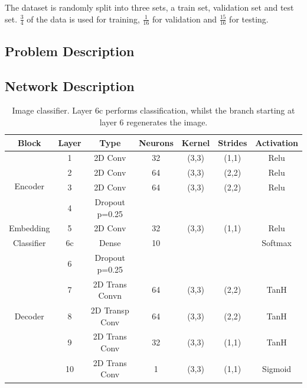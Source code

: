 The dataset is randomly split into three sets, a train set, validation set and test set. $\frac{3}{4}$ of the data is used for training, $\frac{1}{16}$ for validation and $\frac{15}{16}$ for testing.	


\subsection{Problem Description}
\subsection{Network Description}
\begin{table}[t]
		\centering
		\begin{tabular}{|c|c|c|c|c|c|c|}
			\hline
			Block & Layer & Type & Neurons & Kernel & Strides & Activation  \\ \hline
			\multirow{4}{*}{Encoder} & 1	&	2D Conv & 32 & (3,3) & (1,1)  & Relu\\ \cline{2-7}
			& 2	&	2D Conv & 64 & (3,3) & (2,2) & Relu \\ \cline{2-7}
			& 3	&	2D Conv & 64 & (3,3) & (2,2) & Relu \\ \cline{2-7}
			& 4 	&	Dropout p=0.25 &	 & 	     &       & \\ \hline
			Embedding & 5	&	2D Conv & 32 & (3,3) & (1,1) & Relu \\ \hline
			Classifier & 6c	&	Dense          & 10 &       &       & Softmax      \\ \hline
			\multirow{5}{*}{Decoder}& 6 	&	Dropout p=0.25 &	 & 	     &       & \\ \cline{2-7}
			& 7	&	2D Trans Convn & 64 & (3,3) & (2,2) & TanH \\ \cline{2-7}
			& 8	&	2D Transp Conv & 64 & (3,3) & (2,2) & TanH \\ \cline{2-7}
			& 9	&	2D Trans Conv & 32 & (3,3) & (1,1) & TanH \\ \cline{2-7}
			& 10	&	2D Trans Conv & 1 & (3,3) & (1,1) & Sigmoid \\ \hline
		\end{tabular}
		\caption{Image classifier. Layer 6c performs classification, whilst the branch starting at layer 6 regenerates the image.}
		\label{tab:flikr_im_description}
	\end{table}
	
